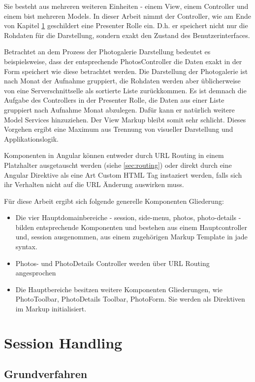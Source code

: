 Sie besteht aus mehreren weiteren Einheiten - einem View, einem Controller und einem bist mehreren Models. In dieser Arbeit nimmt der Controller, wie am Ende von  Kapitel \ref{} geschildert eine Presenter Rolle ein. D.h. er speichert nicht nur die Rohdaten für die Darstellung, sondern exakt den Zustand des Benutzerinterfaces. 

Betrachtet an dem Prozess der Photogalerie Darstellung bedeutet es beispielsweise, dass der entsprechende PhotosController die Daten exakt in der Form speichert wie diese betrachtet werden. Die Darstellung der Photogalerie ist nach Monat der Aufnahme gruppiert, die Rohdaten werden aber üblicherweise von eine Serverschnittselle als sortierte Liste zurückkommen. Es ist demnach die Aufgabe des Controllers in der Presenter Rolle, die Daten aus einer Liste gruppiert nach Aufnahme Monat abzulegen. Dafür kann er natürlich weitere Model Services hinzuziehen. Der View Markup bleibt somit sehr schlicht. Dieses Vorgehen ergibt eine Maximum aus Trennung von visueller Darstellung und Applikationslogik.

Komponenten in Angular können entweder durch URL Routing in einem Platzhalter ausgetauscht werden (siehe \ref{sec:routing}) oder direkt durch eine Angular Direktive als eine Art Custom HTML Tag instaziert werden, falls sich ihr Verhalten nicht auf die URL Änderung auswirken muss. 

Für diese Arbeit ergibt sich folgende generelle Komponenten Gliederung:

\begin{itemize}
\item Die vier Hauptdomainbereiche - session, side-menu, photos, photo-details - bilden entsprechende Komponenten und bestehen aus einem Hauptcontroller und, session ausgenommen, aus einem zugehörigen Markup Template in \gls{jade} syntax. 
\item Photos- und PhotoDetails Controller werden über URL Routing angesprochen
\item Die Hauptbereiche besitzen weitere Komponenten Gliederungen, wie PhotoToolbar, PhotoDetails Toolbar, PhotoForm. Sie werden als Direktiven im Markup initialisiert.
\end{itemize}

\section{Session Handling}

\subsection{Grundverfahren}
\label{sec:session_handling_basics}

